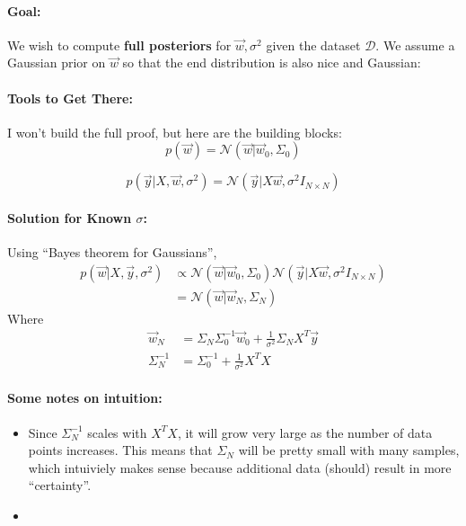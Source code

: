 \documentclass[a4paper,12pt]{report}
\begin{document}
\paragraph{Goal: } We wish to compute \textbf{full posteriors} for $\vec w, \sigma^2$ given the dataset $\mathcal D$. We assume a Gaussian prior on $\vec w$ so that the end distribution is also nice and Gaussian:

\paragraph{Tools to Get There: } I won't build the full proof, but here are the building blocks:
\begin{equation}
p(\vec w) = \mathcal N(\vec w | \vec w_0, \Sigma_0)
\end{equation}

\begin{equation}
p(\vec y | X, \vec w, \sigma^2) = \mathcal N(\vec y | X\vec w, \sigma^2I_{N\times N})
\end{equation}

\paragraph{Solution for Known $\sigma$: } Using ``Bayes theorem for Gaussians'',
\begin{equation}
\begin{split}
p(\vec w | X, \vec y, \sigma^2) &\propto \mathcal N(\vec w | \vec w_0, \Sigma_0)\mathcal N(\vec y | X\vec w, \sigma^2 I_{N\times N}) \\
&= \mathcal N(\vec w | \vec w_N, \Sigma_N)
\end{split}
\end{equation}
Where 
\begin{equation}
\begin{split}
\vec w_N &= \Sigma_N\Sigma_0^{-1}\vec w_0 + \frac{1}{\sigma^2} \Sigma_N X^T\vec y \\
\Sigma_N^{-1} &= \Sigma_0^{-1} + \frac{1}{\sigma^2} X^T X
\end{split}
\end{equation}



\paragraph{Some notes on intuition: } 
\begin{itemize}
\item Since $\Sigma_N^{-1}$ scales with $X^T X$, it will grow very large as the number of data points increases. This means that $\Sigma_N$ will be pretty small with many samples, which intuiviely makes sense because additional data (should) result in more ``certainty''.
\item 
\end{itemize}
\end{document}
